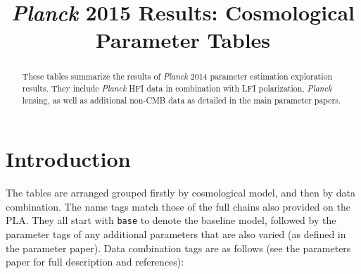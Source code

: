 \title{\textit{Planck} 2015 Results: Cosmological Parameter Tables}


\maketitle
\begin{abstract}
These tables summarize the results of \textit{Planck} 2014 parameter estimation exploration results. They include \textit{Planck} HFI data in combination with LFI polarization, \textit{Planck} lensing, as well as additional non-CMB data as detailed in the main parameter papers.
\end{abstract}

\newpage
\section{Introduction}

The tables are arranged grouped firstly by cosmological model, and then by data combination. The name tags match those of the full chains also provided on the PLA. They all start with {\tt base} to denote the baseline model, followed by the parameter tags of any additional parameters that are also varied (as defined in the parameter paper). Data combination tags are as follows (see the parameters paper for full description and references):

